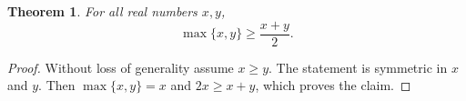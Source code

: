 \documentclass{article}
\newtheorem{theorem}{Theorem}
\begin{document}
\begin{theorem}\label{thm:clean-wlog}
For all real numbers $x,y$,
\[
  \max\{x,y\}\ge \frac{x+y}{2}.
\]
\end{theorem}
\begin{proof}
Without loss of generality assume $x\ge y$. The statement is symmetric in
$x$ and $y$. Then $\max\{x,y\}=x$ and
$2x\ge x+y$, which proves the claim.
\end{proof}
\end{document}
